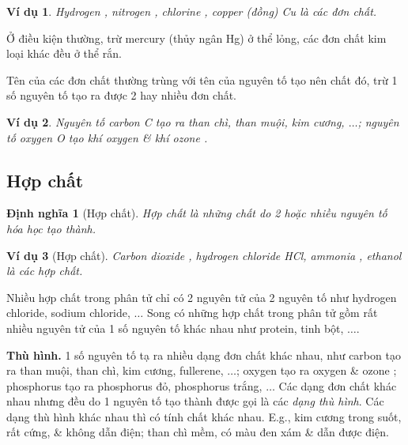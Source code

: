 \documentclass{article}
\newtheorem{dinhnghia}{Định nghĩa}
\newtheorem{vidu}{Ví dụ}
\begin{document}
\begin{vidu}
	Hydrogen \emph{}, nitrogen \emph{}, chlorine \emph{}, copper (đồng) \emph{Cu} là các đơn chất.
\end{vidu}
Ở điều kiện thường, trừ mercury (thủy ngân Hg) ở thể lỏng, các đơn chất kim loại khác đều ở thể rắn.

Tên của các đơn chất thường trùng với tên của nguyên tố tạo nên chất đó, trừ 1 số nguyên tố tạo ra được 2 hay nhiều đơn chất.

\begin{vidu}
	Nguyên tố carbon \emph{C} tạo ra than chì, than muội, kim cương, $\ldots$; nguyên tố oxygen \emph{O} tạo khí oxygen \emph{} \& khí ozone \emph{}.
\end{vidu}

\subsection{Hợp chất}

\begin{dinhnghia}[Hợp chất]
	\emph{Hợp chất} là những chất do 2 hoặc nhiều nguyên tố hóa học tạo thành.
\end{dinhnghia}

\begin{vidu}[Hợp chất]
	Carbon dioxide , hydrogen chloride HCl, ammonia , ethanol  là các hợp chất.
\end{vidu}
Nhiều hợp chất trong phân tử chỉ có 2 nguyên tử của 2 nguyên tố như hydrogen chloride, sodium chloride, $\ldots$ Song có những hợp chất trong phân tử gồm rất nhiều nguyên tử của 1 số nguyên tố khác nhau như protein, tinh bột, $\ldots$.

\textbf{Thù hình.} 1 số nguyên tố tạ ra nhiều dạng đơn chất khác nhau, như carbon tạo ra than muội, than chì, kim cương, fullerene, $\ldots$; oxygen tạo ra oxygen  \& ozone ; phosphorus tạo ra phosphorus đỏ, phosphorus trắng, $\ldots$ Các dạng đơn chất khác nhau nhưng đều do 1 nguyên tố tạo thành được gọi là các \textit{dạng thù hình}. Các dạng thù hình khác nhau thì có tính chất khác nhau. E.g., kim cương trong suốt, rất cứng, \& không dẫn điện; than chì mềm, có màu đen xám \& dẫn được điện.

\noindent{}
\end{document}
